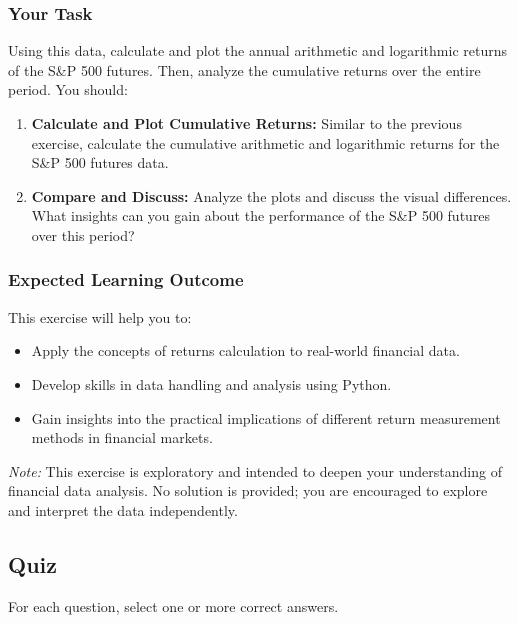 \documentclass{article}
\begin{document}
\subsubsection{Your Task}

Using this data, calculate and plot the annual arithmetic and logarithmic returns of the S\&P 500 futures. Then, analyze the cumulative returns over the entire period. You should:

\begin{enumerate}
    \item \textbf{Calculate and Plot Cumulative Returns:} Similar to the previous exercise, calculate the cumulative arithmetic and logarithmic returns for the S\&P 500 futures data.
    \item \textbf{Compare and Discuss:} Analyze the plots and discuss the visual differences. What insights can you gain about the performance of the S\&P 500 futures over this period?
\end{enumerate}

\subsubsection{Expected Learning Outcome}

This exercise will help you to:
\begin{itemize}
    \item Apply the concepts of returns calculation to real-world financial data.
    \item Develop skills in data handling and analysis using Python.
    \item Gain insights into the practical implications of different return measurement methods in financial markets.
\end{itemize}

\textit{Note:} This exercise is exploratory and intended to deepen your understanding of financial data analysis. No solution is provided; you are encouraged to explore and interpret the data independently.

\subsection{Quiz}
For each question, select one or more correct answers.
\end{document}
